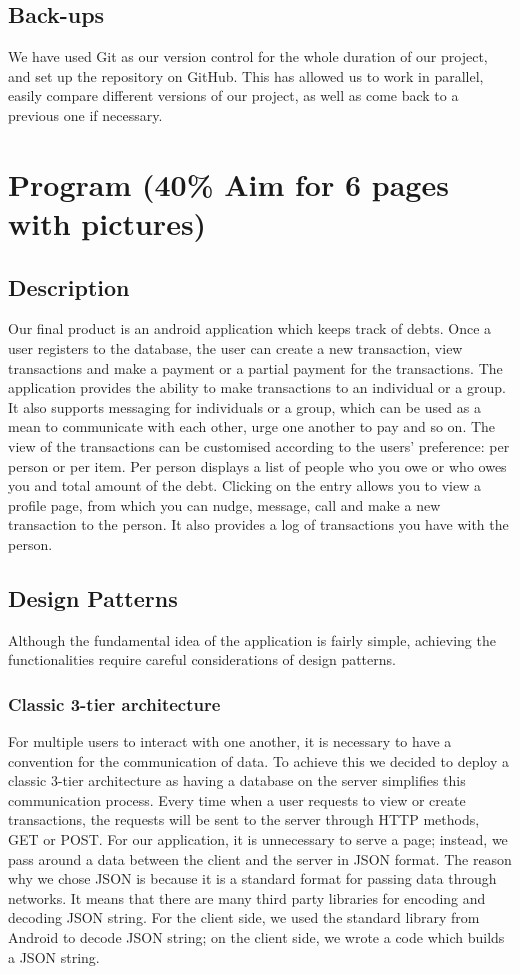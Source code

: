 \documentclass[a4paper,11pt]{article}
\begin{document}
\subsection{Back-ups}
We have used Git as our version control for the whole duration of our project, and set up the repository on GitHub. This has allowed us to work in parallel, easily compare different versions of our project, as well as come back to a previous one if necessary.


\section*{Program (40\% Aim for 6 pages with pictures)}
\subsection*{Description}
Our final product is an android application which keeps track of debts. Once a user registers to the database, the user can create a new transaction, view transactions and make a payment or a partial payment for the transactions. The application provides the ability to make transactions to an individual or a group. It also supports messaging for individuals or a group, which can be used as a mean to communicate with each other, urge one another to pay and so on. The view of the transactions can be customised according to the users’ preference: per person or per item. Per person displays a list of people who you owe or who owes you and total amount of the debt. Clicking on the entry allows you to view a profile page, from which you can nudge, message, call and make a new transaction to the person. It also provides a log of transactions you have with the person.

\subsection*{Design Patterns}
Although the fundamental idea of the application is fairly simple, achieving the functionalities require careful considerations of design patterns. 

\subsubsection*{Classic 3-tier architecture}
For multiple users to interact with one another, it is necessary to have a convention for the communication of data. To achieve this we decided to deploy a classic 3-tier architecture as having a database on the server simplifies this communication process. Every time when a user requests to view or create transactions, the requests will be sent to the server through HTTP methods, GET or POST. For our application, it is unnecessary to serve a page; instead, we pass around a data between the client and the server in JSON format. The reason why we chose JSON is because it is a standard format for passing data through networks. It means that there are many third party libraries for encoding and decoding JSON string. For the client side, we used the standard library from Android to decode JSON string; on the client side, we wrote a code which builds a JSON string. 
\end{document}
